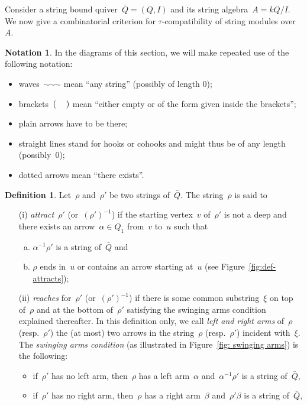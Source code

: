 \documentclass{memo-l}
\theoremstyle{definition}
\newtheorem{definition}[theorem]{Definition}
\newtheorem{notation}[theorem]{Notation}
\newcommand{\darkblue}{\color{darkblue}} %
\newcommand{\defn}[1]{\textsl{\darkblue #1}} %
\begin{document}
Consider a string bound quiver~$\bar Q = (Q,I)$ and its string algebra~${A = kQ/I}$.
We now give a combinatorial criterion for $\tau$-compatibility of string modules over~$A$.

\begin{notation}
In the diagrams of this section, we will make repeated use of the following notation:
\begin{itemize}
 \item waves~$\xy \ar@{~} (0,0);(7,0) \endxy$ mean ``any string'' (possibly of length 0);
 \item brackets~$( \hspace{1pc} )$ mean ``either empty or of the form given inside the brackets'';
 \item plain arrows have to be there;
 \item straight lines stand for hooks or cohooks and might thus be of any length (possibly~$0$);
 \item dotted arrows mean ``there exists''.
\end{itemize}
\end{notation}

\begin{definition}
\label{definition: dance and attract}
Let~$\rho$ and~$\rho'$ be two strings of~$\bar Q$. The string~$\rho$ is said to
\begin{itemize}
\item[(i)] \defn{attract}~$\rho'$ (or~$(\rho')^{-1}$) if the starting vertex~$v$ of~$\rho'$ is not a deep and there exists an arrow~$\alpha \in Q_1$ from~$v$ to~$u$ such that
	\begin{enumerate}[(a)]
	\item $\alpha^{-1}\rho'$ is a string of~$\bar Q$ and
	\item $\rho$ ends in~$u$ or contains an arrow starting at~$u$ (see Figure~\ref{fig:def-attracts});
	\end{enumerate}
\item[(ii)] \defn{reaches} for~$\rho'$ (or~$(\rho')^{-1}$) if there is some common substring~$\xi$ on top of~$\rho$ and at the bottom of~$\rho'$ satisfying the swinging arms condition explained thereafter. In this definition only, we call \defn{left and right arms} of~$\rho$ (resp.~$\rho'$) the (at most) two arrows in the string~$\rho$ (resp.~$\rho'$) incident with~$\xi$. The \defn{swinging arms condition} (as illustrated in Figure~\ref{fig: swinging arms}) is the following: 
\begin{itemize}
\item if~$\rho'$ has no left arm, then~$\rho$ has a left arm~$\alpha$ and~$\alpha^{-1}\rho'$ is a string of~$\bar Q$,
\item if~$\rho'$ has no right arm, then~$\rho$ has a right arm~$\beta$ and~$\rho'\beta$ is a string of~$\bar Q$,
\end{itemize}
\end{itemize}
\end{definition}
\end{document}
